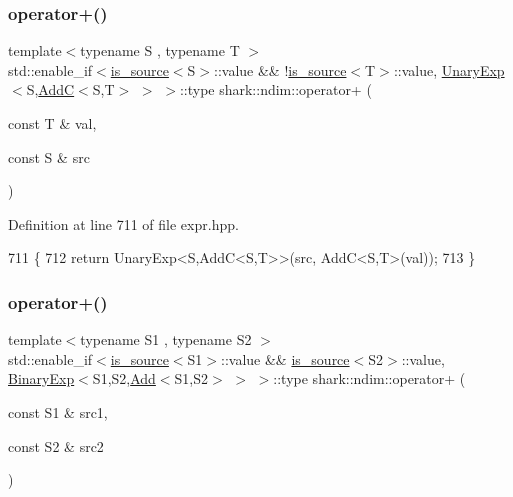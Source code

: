 \subsubsection{\texorpdfstring{operator+()}{operator+()}\hspace{0.1cm}{\footnotesize\ttfamily [4/5]}}
{\footnotesize\ttfamily template$<$typename S , typename T $>$ \\
std\+::enable\+\_\+if$<$\hyperlink{classshark_1_1ndim_1_1is__source}{is\+\_\+source}$<$S$>$\+::value \&\& !\hyperlink{classshark_1_1ndim_1_1is__source}{is\+\_\+source}$<$T$>$\+::value, \hyperlink{classshark_1_1ndim_1_1_unary_exp}{Unary\+Exp}$<$S,\hyperlink{classshark_1_1ndim_1_1_add_c}{AddC}$<$S,T$>$ $>$ $>$\+::type shark\+::ndim\+::operator+ (\begin{DoxyParamCaption}\item[{const T \&}]{val,  }\item[{const S \&}]{src }\end{DoxyParamCaption})}



Definition at line 711 of file expr.\+hpp.


\begin{DoxyCode}
711                                                                                                            
                                   \{
712             \textcolor{keywordflow}{return} UnaryExp<S,AddC<S,T>>(src, AddC<S,T>(val));
713         \}
\end{DoxyCode}
\hypertarget{namespaceshark_1_1ndim_acc0eab01656face90121867d6c7ccca6}{}\label{namespaceshark_1_1ndim_acc0eab01656face90121867d6c7ccca6} 
\subsubsection{\texorpdfstring{operator+()}{operator+()}\hspace{0.1cm}{\footnotesize\ttfamily [5/5]}}
{\footnotesize\ttfamily template$<$typename S1 , typename S2 $>$ \\
std\+::enable\+\_\+if$<$\hyperlink{classshark_1_1ndim_1_1is__source}{is\+\_\+source}$<$S1$>$\+::value \&\& \hyperlink{classshark_1_1ndim_1_1is__source}{is\+\_\+source}$<$S2$>$\+::value, \hyperlink{classshark_1_1ndim_1_1_binary_exp}{Binary\+Exp}$<$S1,S2,\hyperlink{classshark_1_1ndim_1_1_add}{Add}$<$S1,S2$>$ $>$ $>$\+::type shark\+::ndim\+::operator+ (\begin{DoxyParamCaption}\item[{const S1 \&}]{src1,  }\item[{const S2 \&}]{src2 }\end{DoxyParamCaption})}



